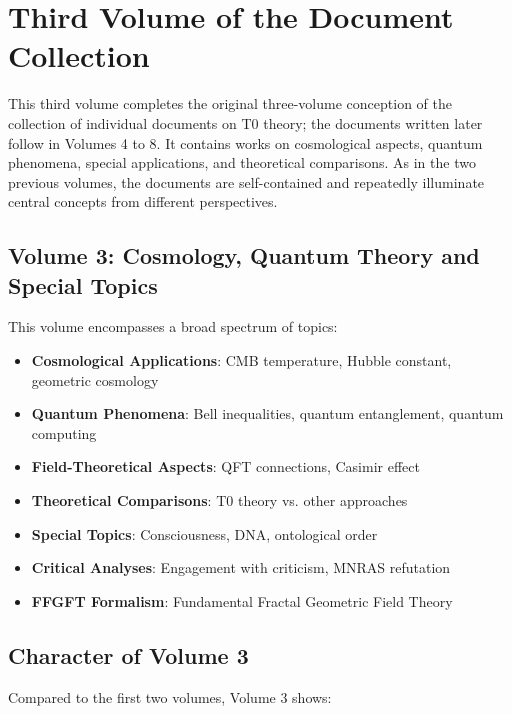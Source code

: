 \section*{Third Volume of the Document Collection}

This third volume completes the original three-volume conception of the collection of individual documents on T0 theory; the documents written later follow in Volumes 4 to 8. It contains works on cosmological aspects, quantum phenomena, special applications, and theoretical comparisons. As in the two previous volumes, the documents are self-contained and repeatedly illuminate central concepts from different perspectives.

\subsection*{Volume 3: Cosmology, Quantum Theory and Special Topics}

This volume encompasses a broad spectrum of topics:

\begin{itemize}
\item \textbf{Cosmological Applications}: CMB temperature, Hubble constant, geometric cosmology
\item \textbf{Quantum Phenomena}: Bell inequalities, quantum entanglement, quantum computing
\item \textbf{Field-Theoretical Aspects}: QFT connections, Casimir effect
\item \textbf{Theoretical Comparisons}: T0 theory vs. other approaches
\item \textbf{Special Topics}: Consciousness, DNA, ontological order
\item \textbf{Critical Analyses}: Engagement with criticism, MNRAS refutation
\item \textbf{FFGFT Formalism}: Fundamental Fractal Geometric Field Theory
\end{itemize}

\subsection*{Character of Volume 3}

Compared to the first two volumes, Volume 3 shows:

